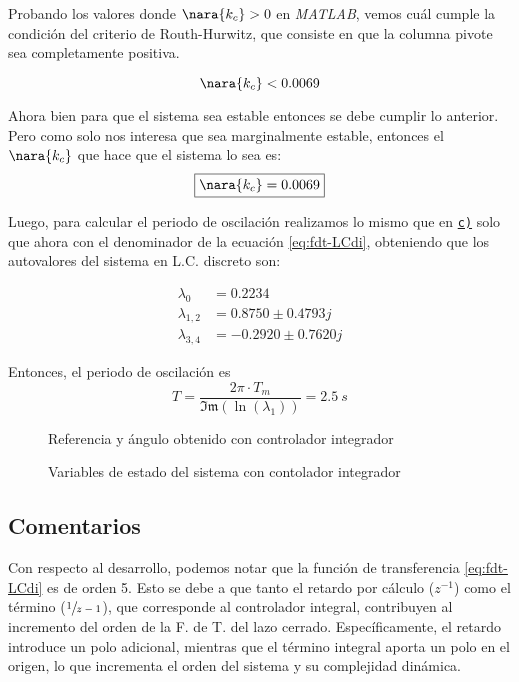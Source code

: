 Probando los valores donde $\nara{k_{c}} > 0$ en \textit{MATLAB}, vemos cuál
cumple la condición del criterio de Routh-Hurwitz, que consiste en que la columna
pivote sea completamente positiva.

\begin{equation}
    \nara{k_{c}}  < 0.0069
\end{equation}

Ahora bien para que el sistema sea estable entonces se debe cumplir lo anterior. Pero 
como solo nos interesa que sea marginalmente estable, entonces el $\nara{k_{c}}$
que hace que el sistema lo sea es:
\begin{equation}
    \boxed{\nara{k_c} = 0.0069}
\end{equation}

Luego, para calcular el periodo de oscilación realizamos lo mismo que en
\hyperref[pregunta-c]{\texttt{c)}} solo que ahora con el denominador de la
ecuación \eqref{eq:fdt-LCdi}, obteniendo que los autovalores del sistema en L.C.
discreto son:

\begin{align*}
  \lambda_{0} &= 0.2234\\
  \lambda_{1,2} &= 0.8750 \pm 0.4793j\\
  \lambda_{3,4} &= -0.2920 \pm 0.7620j
\end{align*}

Entonces, el periodo de oscilación es
\begin{equation}
    T = \frac{2\pi \cdot T_{m}}{\mathfrak{Im}(\ln(\lambda_{1}))} = 2.5\ \unit{s} 
\end{equation}

\begin{figure}[h]
    \centering
    
    \caption{Referencia y ángulo obtenido con controlador integrador}\label{fig:psi-int-disc-marge}
\end{figure}

\begin{figure}[h]
  \centering
  
  \caption{Variables de estado del sistema con contolador integrador}\label{fig:estado-int-disc-marge}
\end{figure}
  
\FloatBarrier
\subsection{Comentarios}

Con respecto al desarrollo, podemos notar que la función de transferencia 
\eqref{eq:fdt-LCdi} es de orden 5. Esto se debe a que tanto el retardo por 
cálculo ($z^{-1}$) como el término ($\sfrac{1}{z-1}$), que corresponde al 
controlador integral, contribuyen al incremento del orden de la F. de T. del 
lazo cerrado. Específicamente, el retardo introduce un polo adicional, mientras 
que el término integral aporta un polo en el origen, lo que incrementa el orden 
del sistema y su complejidad dinámica.

